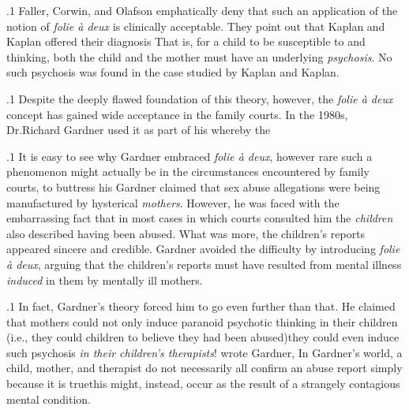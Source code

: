 \documentclass[11pt, twoside]{article}
\begin{document}
{\p.1{%
Faller, Corwin, and Olafson emphatically deny that such an application of
the notion of \textit{folie à deux} is clinically acceptable. They point
out that Kaplan and Kaplan offered their diagnosis  That is, for a child to be susceptible to
 and  thinking, both the child and the mother
must have an underlying \textit{psychosis}. No such psychosis was found in the
case studied by Kaplan and Kaplan.
}%

\p.1{%
Despite the deeply flawed foundation of this theory, however, the
\textit{folie à deux} concept has gained wide acceptance in the family courts.
In the 1980s, Dr.\@ Richard Gardner used it as part of his
\mdash{} whereby the 
}%

\p.1{%
It is easy to see why Gardner embraced \textit{folie à deux}, however rare
such a phenomenon might actually be in the circumstances encountered
by family courts, to buttress his  Gardner claimed that sex
abuse allegations were being manufactured by hysterical \textit{mothers}. However, he was faced with the embarrassing fact that in most cases in which
courts consulted him the \textit{children} also described having been abused.
What was more, the children’s reports appeared sincere and credible.
Gardner avoided the difficulty by introducing \textit{folie à deux}, arguing that
the children’s reports must have resulted from mental illness \textit{induced} in
them by mentally ill mothers.
}%

\p.1{%
In fact, Gardner’s theory forced him to go even further than that. He
claimed that mothers could not only induce paranoid psychotic thinking in their children (i.e., they could  children to believe they
had been abused)\mdash{}they could even induce such psychosis \textit{in their
children’s therapists}!  wrote Gardner,
 In Gardner’s world, a
child, mother, and therapist do not necessarily all confirm an abuse report simply because it is true\mdash{}this might, instead, occur as the result of
a strangely contagious mental condition.
}%

}
\end{document}
